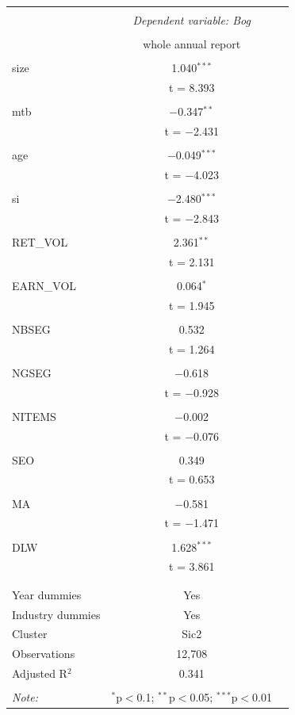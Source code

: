 \documentclass[a4paper]{article}
\begin{document}
\begin{center}
\begin{longtable}{@{\extracolsep{5pt}}lcc}
\\[-1.8ex]\hline 
\hline \\[-1.8ex] 
 & \multicolumn{1}{c}{\textit{Dependent variable: Bog}} \\ 
\cline{2-2} 
\\[-1.8ex] & whole annual report \\ 
\hline \\[-1.8ex] 
 size & 1.040$^{***}$ \\ 
  & t = 8.393 \\ 
  & \\ 
 mtb & $-$0.347$^{**}$ \\ 
  & t = $-$2.431 \\ 
  & \\ 
 age & $-$0.049$^{***}$ \\ 
  & t = $-$4.023 \\ 
  & \\ 
 si & $-$2.480$^{***}$ \\ 
  & t = $-$2.843 \\ 
  & \\ 
 RET\_VOL & 2.361$^{**}$ \\ 
  & t = 2.131 \\ 
  & \\ 
 EARN\_VOL & 0.064$^{*}$ \\ 
  & t = 1.945 \\ 
  & \\ 
 NBSEG & 0.532 \\ 
  & t = 1.264 \\ 
  & \\ 
 NGSEG & $-$0.618 \\ 
  & t = $-$0.928 \\ 
  & \\ 
 NITEMS & $-$0.002 \\ 
  & t = $-$0.076 \\ 
  & \\ 
 SEO & 0.349 \\ 
  & t = 0.653 \\ 
  & \\ 
 MA & $-$0.581 \\ 
  & t = $-$1.471 \\ 
  & \\ 
 DLW & 1.628$^{***}$ \\ 
  & t = 3.861 \\ 
  & \\ 
\hline \\[-1.8ex] 
Year dummies & Yes \\ 
Industry dummies & Yes \\ 
Cluster & Sic2 \\ 
Observations & 12,708 \\ 
Adjusted R$^{2}$ & 0.341 \\ 
\hline 
\hline \\[-1.8ex] 
\textit{Note:}  & \multicolumn{1}{r}{$^{*}$p$<$0.1; $^{**}$p$<$0.05; $^{***}$p$<$0.01} \\ 

\end{longtable}
\end{center}
\end{document}
